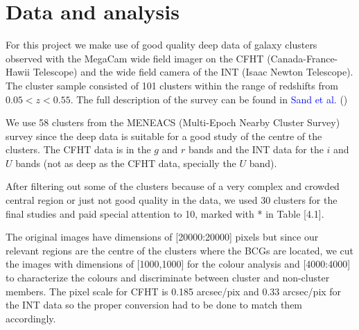 \chapter{Data and analysis}

For this project we make use of good quality deep data of galaxy clusters observed with the MegaCam wide field imager on the CFHT (Canada-France-Hawii Telescope) and the wide field camera of the INT (Isaac Newton Telescope). The cluster sample consisted of 101 clusters within the range of redshifts from $0.05<z<0.55$. The full description of the survey can be found in \textcolor{blue}{Sand et al.} (\citeyear{Reference11})

We use 58 clusters from the MENEACS (Multi-Epoch Nearby Cluster Survey) survey since the deep data is suitable for a good study of the centre of the clusters. The CFHT data is in the $g$ and $r$ bands and the INT data for the $i$ and $U$ bands (not as deep as the CFHT data, specially the $U$ band). 

After filtering out some of the clusters because of a very complex and crowded central region or just not good quality in the data, we used 30 clusters for the final studies and paid special attention to 10, marked with * in Table [4.1].

The original images have dimensions of [20000:20000] pixels but since our relevant regions are the centre of the clusters where the BCGs are located, we cut the images with dimensions of [1000,1000] for the colour analysis and [4000:4000] to characterize the colours and discriminate between cluster and non-cluster members. The pixel scale for CFHT is 0.185 arcsec/pix and 0.33 arcsec/pix for the INT data so the proper conversion had to be done to match them accordingly.

